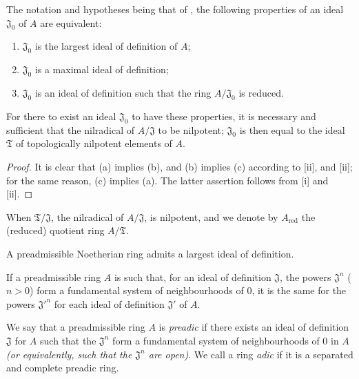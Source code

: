 \begin{corollary}[7.1.6]
\label{0.7.1.6}
The notation and hypotheses being that of , the following
properties of an ideal $\mathfrak{J}_0$ of $A$ are equivalent:
\begin{enumerate}
  \item[{\rm(a)}] $\mathfrak{J}_0$ is the largest ideal of definition of $A$;
  \item[{\rm(b)}] $\mathfrak{J}_0$ is a maximal ideal of definition;
  \item[{\rm(c)}] $\mathfrak{J}_0$ is an ideal of definition such that the ring $A/\mathfrak{J}_0$ is reduced.
\end{enumerate}
For there to exist an ideal $\mathfrak{J}_0$ to have these properties, it is
necessary and sufficient that the nilradical of $A/\mathfrak{J}$ to be
nilpotent; $\mathfrak{J}_0$ is then equal to the ideal $\mathfrak{T}$ of
topologically nilpotent elements of $A$.
\end{corollary}

\begin{proof}
It is clear that (a) implies (b), and (b) implies (c) according to
[ii], and [ii]; for the same
reason, (c) implies (a). The latter assertion follows from [i] and
[ii].
\end{proof}

When $\mathfrak{T}/\mathfrak{J}$, the nilradical of $A/\mathfrak{J}$, is
nilpotent, and we denote by $A_\text{red}$ the (reduced) quotient ring
$A/\mathfrak{T}$.

\begin{corollary}[7.1.7]
\label{0.7.1.7}
A preadmissible Noetherian ring admits a largest ideal of definition.
\end{corollary}

\begin{corollary}[7.1.8]
\label{0.7.1.8}
If a preadmissible ring $A$ is such that, for an ideal of definition
$\mathfrak{J}$, the powers $\mathfrak{J}^n$ ($n>0$) form a fundamental system
of neighbourhoods of $0$, it is the same for the powers ${\mathfrak{J}'}^n$ for
each ideal of definition $\mathfrak{J}'$ of $A$.
\end{corollary}

\begin{definition}[7.1.9]
\label{0.7.1.9}
We say that a preadmissible ring $A$ is \emph{preadic} if there exists an
ideal of definition $\mathfrak{J}$ for $A$ such that the $\mathfrak{J}^n$ form
a fundamental system of neighbourhoods of $0$ in $A$ \emph{(or equivalently, such
that the $\mathfrak{J}^n$ are \emph{open})}. We call a ring \emph{adic} if it
is a separated and complete preadic ring.
\end{definition}

